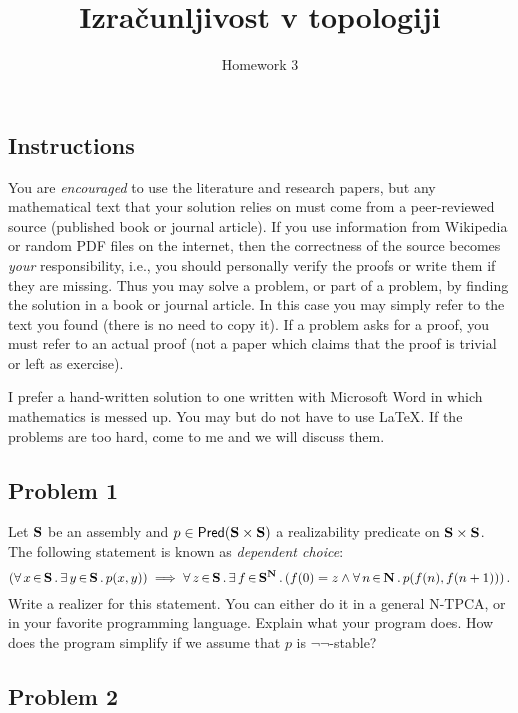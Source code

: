 \documentclass[a4paper,11pt]{article}
\begin{document}
\title{Izračunljivost v topologiji}
\author{Homework 3}
\date{}

\maketitle


\subsection*{Instructions}

You are \emph{encouraged} to use the literature and research papers,
but any mathematical text that your solution relies on must come from
a peer-reviewed source (published book or journal article).
%
If you use information from Wikipedia or random PDF files on the
internet, then the correctness of the source becomes \emph{your}
responsibility, i.e., you should personally verify the proofs or write
them if they are missing.
%
Thus you may solve a problem, or part of a problem, by finding the
solution in a book or journal article. In this case you may simply
refer to the text you found (there is no need to copy it). If a
problem asks for a proof, you must refer to an actual proof (not a
paper which claims that the proof is trivial or left as exercise).

I prefer a hand-written solution to one written with Microsoft Word in
which mathematics is messed up. You may but do not have to use
{\LaTeX}.
%
If the problems are too hard, come to me and we will discuss them.


\subsection*{Problem 1}

Let $\mathbf{S}$ be an assembly and $p \in \mathsf{Pred}(\mathbf{S} \times \mathbf{S})$
a realizability predicate on $\mathbf{S} \times \mathbf{S}$. The following
statement is known as \emph{dependent choice}:
%
\begin{equation*}
  (\forall\, x \,{\in}\, \mathbf{S}\,.\,\exists\, y \,{\in}\, \mathbf{S}\,.\,p(x,y)) \implies
  \forall\, z \,{\in}\, \mathbf{S}\,.\,
    \exists\, f \,{\in}\, \mathbf{S}^{\mathbf{N}}\,.\left(
      f(0) = z \land \forall\, n \,{\in}\, \mathbf{N}\,.\,p(f(n), f(n+1))
    \right)
 .
\end{equation*}
%
Write a realizer for this statement. You can either do it in a general
N-TPCA, or in your favorite programming language. Explain what your
program does. How does the program simplify if we assume that $p$ is
$\lnot\lnot$-stable?


\subsection*{Problem 2}
\end{document}
